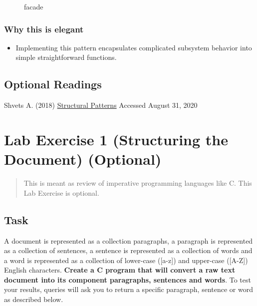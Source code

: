 \begin{figure}
\centering
{}
\caption{facade}
\end{figure}

\subsection{Why this is
elegant}\label{structural-patterns.md__why-this-is-elegant-3}

\begin{itemize}
\tightlist
\item
  Implementing this pattern encapsulates complicated subsystem behavior
  into simple straightforward functions.
\end{itemize}

\section{Optional
Readings}\label{structural-patterns.md__optional-readings}

Shvets A. (2018)
\href{https://sourcemaking.com/design_patterns/structural_patterns}{Structural
Patterns} Accessed August 31, 2020

\chapter{Lab Exercise 1 (Structuring the Document)
(Optional)}\label{lab-exercise-1-structuring-the-document.md__lab-exercise-1-structuring-the-document-optional}

\begin{quote}
This is meant as review of imperative programming languages like C. This
Lab Exercise is optional.
\end{quote}

\section{Task}\label{lab-exercise-1-structuring-the-document.md__task}

A document is represented as a collection paragraphs, a paragraph is
represented as a collection of sentences, a sentence is represented as a
collection of words and a word is represented as a collection of
lower-case ({[}a-z{]}) and upper-case ({[}A-Z{]}) English characters.
\textbf{Create a C program that will convert a raw text document into
its component paragraphs, sentences and words}. To test your results,
queries will ask you to return a specific paragraph, sentence or word as
described below.

